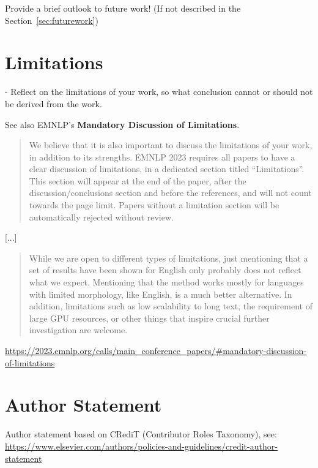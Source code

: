 \documentclass[sigconf, review, nonacm]{acmart}
\begin{document}

Provide a brief outlook to future work! (If not described in the Section~\ref{sec:futurework})


\section*{Limitations}

- Reflect on the limitations of your work, so what conclusion cannot or should not be derived from the work.

See also EMNLP's \textbf{Mandatory Discussion of Limitations}.

\begin{quote}
    We believe that it is also important to discuss the limitations of your work, in addition to its strengths. EMNLP 2023 requires all papers to have a clear discussion of limitations, in a dedicated section titled “Limitations”. This section will appear at the end of the paper, after the discussion/conclusions section and before the references, and will not count towards the page limit. Papers without a limitation section will be automatically rejected without review.
\end{quote}

[...]

\begin{quote}
While we are open to different types of limitations, just mentioning that a set of results have been shown for English only probably does not reflect what we expect. Mentioning that the method works mostly for languages with limited morphology, like English, is a much better alternative. In addition, limitations such as low scalability to long text, the requirement of large GPU resources, or other things that inspire crucial further investigation are welcome.
\end{quote}

\url{https://2023.emnlp.org/calls/main_conference_papers/#mandatory-discussion-of-limitations}


\section*{Author Statement}


Author statement based on CRediT (Contributor Roles Taxonomy), see: \url{https://www.elsevier.com/authors/policies-and-guidelines/credit-author-statement}
\end{document}
